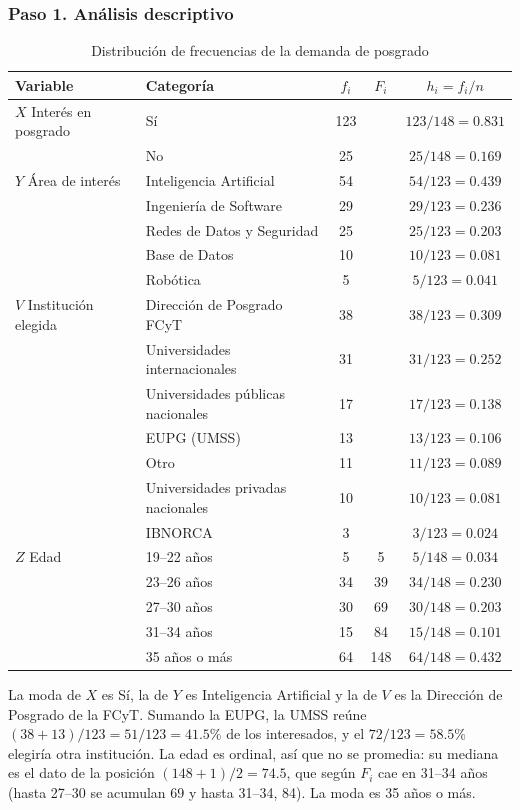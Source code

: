 \documentclass[12pt, a4paper]{article}
\newenvironment{mitabla}[2][H]{%
  \begin{table}[#1]
  \centering
  \caption{#2}
  \small
}{%
  \end{table}
}
\begin{document}
\subsubsection{Paso 1. Análisis descriptivo}

\begin{mitabla}{Distribución de frecuencias de la demanda de posgrado}\label{tab:a2-frec}
\begin{tabular}{llccc}
\toprule
\textbf{Variable} & \textbf{Categoría} & \textbf{$f_i$} & \textbf{$F_i$} & \textbf{$h_i = f_i/n$} \\
\midrule
$X$ Interés en posgrado & Sí & 123 & & $123/148 = 0.831$ \\
 & No & 25 & & $25/148 = 0.169$ \\
\midrule
$Y$ Área de interés & Inteligencia Artificial & 54 & & $54/123 = 0.439$ \\
 & Ingeniería de Software & 29 & & $29/123 = 0.236$ \\
 & Redes de Datos y Seguridad & 25 & & $25/123 = 0.203$ \\
 & Base de Datos & 10 & & $10/123 = 0.081$ \\
 & Robótica & 5 & & $5/123 = 0.041$ \\
\midrule
$V$ Institución elegida & Dirección de Posgrado FCyT & 38 & & $38/123 = 0.309$ \\
 & Universidades internacionales & 31 & & $31/123 = 0.252$ \\
 & Universidades públicas nacionales & 17 & & $17/123 = 0.138$ \\
 & EUPG (UMSS) & 13 & & $13/123 = 0.106$ \\
 & Otro & 11 & & $11/123 = 0.089$ \\
 & Universidades privadas nacionales & 10 & & $10/123 = 0.081$ \\
 & IBNORCA & 3 & & $3/123 = 0.024$ \\
\midrule
$Z$ Edad & 19--22 años & 5 & 5 & $5/148 = 0.034$ \\
 & 23--26 años & 34 & 39 & $34/148 = 0.230$ \\
 & 27--30 años & 30 & 69 & $30/148 = 0.203$ \\
 & 31--34 años & 15 & 84 & $15/148 = 0.101$ \\
 & 35 años o más & 64 & 148 & $64/148 = 0.432$ \\
\bottomrule
\end{tabular}
\end{mitabla}

La moda de $X$ es Sí, la de $Y$ es Inteligencia Artificial y la de $V$ es
la Dirección de Posgrado de la FCyT. Sumando la EUPG, la UMSS reúne
$(38+13)/123 = 51/123 = 41.5\%$ de los interesados, y el $72/123 =
58.5\%$ elegiría otra institución. La edad es ordinal, así que no se
promedia: su mediana es el dato de la posición $(148+1)/2 = 74.5$, que
según $F_i$ cae en 31--34 años (hasta 27--30 se acumulan 69 y hasta
31--34, 84). La moda es 35 años o más.
\end{document}
